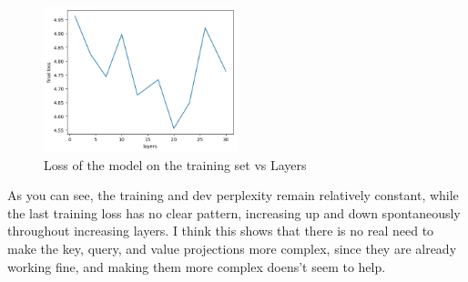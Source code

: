 \documentclass[12pt]{article}
\theoremstyle{definitionstyle}
\begin{document}
    \begin{figure}[H]
        \centering
        \includegraphics[width=0.5\textwidth]{loss_vs_layers.png}
        \caption{Loss of the model on the training set vs Layers}
    \end{figure}
    As you can see, the training and dev perplexity remain relatively constant, while the last training loss has no clear pattern, increasing up and down spontaneously throughout increasing layers. I think this shows that there is no real need to make the key, query, and value projections more complex, since they are already working fine, and making them more complex doens't seem to help. 
\end{document}
